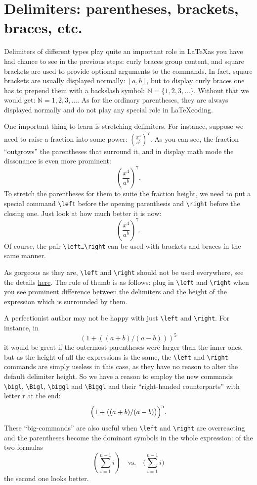 \section{Delimiters: parentheses, brackets, braces, etc.}
\par Delimiters of different types play quite an important role in \LaTeX as you have had chance to see in the previous steps: curly braces group content, and square brackets are used to provide optional arguments to the commands. In fact, square brackets are usually displayed normally: \( [a,b] \), but to display curly braces one has to prepend them with a backslash symbol: \( \mathbb{N} = \{1,2,3,\ldots\} \). Without that we would get: \( \mathbb{N} = {1,2,3,\ldots} \). As for the ordinary parentheses, they are always displayed normally and do not play any special role in \LaTeX coding.
\par One important thing to learn is stretching delimiters. For instance, suppose we need to raise a fraction into some power: \( (\frac{x^4}{a^b})^7 \). As you can see, the fraction ``outgrows'' the parentheses that surround it, and in display math mode the dissonance is even more prominent: \[ (\frac{x^4}{a^b})^7 .\]
To stretch the parentheses for them to suite the fraction height, we need to put a special command \verb"\left" before the opening parenthesis and \verb"\right" before the closing one. Just look at how much better it is now: \[ \left(\frac{x^4}{a^b}\right)^7 .\]
Of course, the pair \verb"\left…\right" can be used with brackets and braces in the same manner.
\par As gorgeous as they are, \verb"\left" and \verb"\right" should not be used everywhere, see the details \href{https://tex.stackexchange.com/a/58641}{here}. The rule of thumb is as follows: plug in \verb"\left" and \verb"\right" when you see prominent difference between the delimiters and the height of the expression which is surrounded by them.
\par A perfectionist author may not be happy with just \verb"\left" and \verb"\right". For instance, in \[\left( 1 + \left( \left( a+b \right)/\left(a-b\right) \right) \right)^5\] it would be great if the outermost parentheses were larger than the inner ones, but as the height of all the expressions is the same, the \verb"\left" and \verb"\right" commands are simply useless in this case, as they have no reason to alter the default delimiter height. So we have a reason to employ the new commands \verb"\bigl", \verb"\Bigl", \verb"\biggl" and \verb"\Biggl"\index{\bigl,\Bigl,\biggl,\Biggl,\bigr,\Bigr,\biggr,\Biggr} and their ``right-handed counterparts'' with letter r at the end: \[\Bigl( 1 + \bigl( (a+b)/(a-b) \bigr) \Bigr)^5.\]
These ``big-commands'' are also useful when \verb"\left" and \verb"\right" are overreacting and the parentheses become the dominant symbols in the whole expression: of the two formulas
\[
\left( \sum_{i=1}^{n-1} i \right)
\quad\text{vs.}\quad
\biggl(\sum_{i=1}^{n-1} i\biggr)
\]
the second one looks better.

